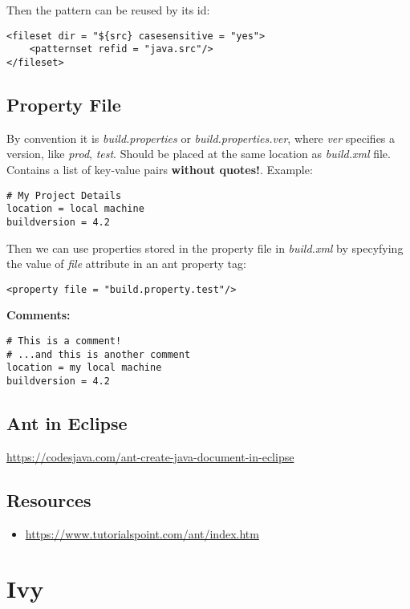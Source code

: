 \documentclass{report}
\begin{document}
Then the pattern can be reused by its id:
\begin{verbatim}
<fileset dir = "${src} casesensitive = "yes">
	<patternset refid = "java.src"/>
</fileset>
\end{verbatim}



\chapter{Property File}
By convention it is \textit{build.properties} or \textit{build.properties.ver},
where \textit{ver} specifies a version, like \textit{prod}, \textit{test}.
Should be placed at the same location as \textit{build.xml} file.
Contains a list of key-value pairs \textbf{without quotes!}. Example:

\begin{verbatim}
# My Project Details
location = local machine
buildversion = 4.2
\end{verbatim}

Then we can use properties stored in the property file in \textit{build.xml}
by specyfying the value of \textit{file} attribute in an ant property tag:
\begin{verbatim}
<property file = "build.property.test"/>
\end{verbatim}

\textbf{Comments:}
\begin{verbatim}
# This is a comment!
# ...and this is another comment
location = my local machine
buildversion = 4.2
\end{verbatim}


\chapter{Ant in Eclipse}
\url{https://codesjava.com/ant-create-java-document-in-eclipse}


\chapter{Resources}

\begin{itemize}
  \item \url{https://www.tutorialspoint.com/ant/index.htm}
\end{itemize}




\part{Ivy}
\end{document}
